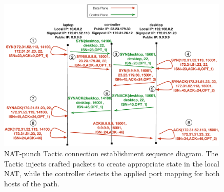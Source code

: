 \begin{itemize}
\begin{figure}
  \begin{center}
	\includegraphics[width=0.99\textwidth]{Chapter3/Chapter3Figs/nat-punch-example}
  \end{center}
  \caption[NAT-punch Tactic connection establishment sequence
  diagram.]{NAT-punch Tactic connection establishment sequence diagram. The
  Tactic injects crafted packets to create appropriate state in the local NAT,
  while the controller detects the applied port mapping for both hosts of the
  \signpost path.}
  \label{fig:signpost:nat-panch-example}
\end{figure}
  

\end{itemize}
